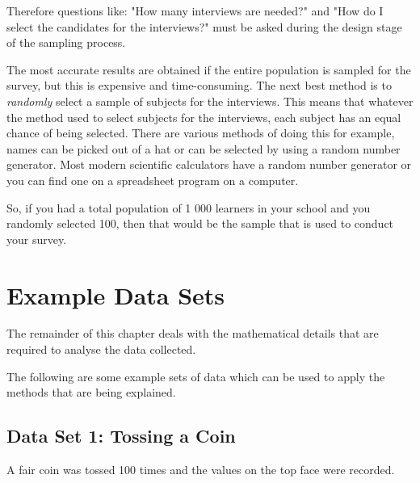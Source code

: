\documentclass[10pt,a4paper,titlepage,twoside,openright]{report}
\begin{document}
Therefore questions like: "How many interviews are needed?" and "How do I select the candidates for the interviews?" must be asked during the design stage of the sampling process.

The most accurate results are obtained if the entire population is sampled for the survey, but this is expensive and time-consuming. The next best method is to \textit{randomly} select a sample of subjects for the interviews. This means that whatever the method used to select subjects for the interviews, each subject has an equal chance of being selected. There are various methods of doing this for example, names can be picked out of a hat or can be selected by using a random number generator. Most modern scientific calculators have a random number generator or you can find one on a spreadsheet program on a computer.

So, if you had a total population of 1 000 learners in your school and you randomly selected 100, then that would be the sample that is used to conduct your survey.

\section{Example Data Sets}

The remainder of this chapter deals with the mathematical details that are required to analyse the data collected.

The following are some example sets of data which can be used to apply the methods that are being explained.

\subsection{Data Set 1: Tossing a Coin}
\label{mdat:s:ed:dataset1}

A fair coin was tossed 100 times and the values on the top face were recorded.
\end{document}
